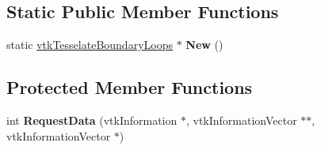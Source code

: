 \subsection*{Static Public Member Functions}
\begin{DoxyCompactItemize}
\item 
\hypertarget{classvtkTesselateBoundaryLoops_a692880228f37fa88efb09daed5b127e6}{
static \hyperlink{classvtkTesselateBoundaryLoops}{vtkTesselateBoundaryLoops} $\ast$ {\bfseries New} ()}
\label{classvtkTesselateBoundaryLoops_a692880228f37fa88efb09daed5b127e6}

\end{DoxyCompactItemize}
\subsection*{Protected Member Functions}
\begin{DoxyCompactItemize}
\item 
\hypertarget{classvtkTesselateBoundaryLoops_a28a774fb854cea1d2f9d8e47ae5806de}{
int {\bfseries RequestData} (vtkInformation $\ast$, vtkInformationVector $\ast$$\ast$, vtkInformationVector $\ast$)}
\label{classvtkTesselateBoundaryLoops_a28a774fb854cea1d2f9d8e47ae5806de}

\end{DoxyCompactItemize}

